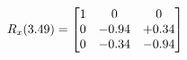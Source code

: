 \documentclass[preview]{standalone}
\begin{document}
\begin{align*}
\special{dvisvgm:raw <g id='unique000'>}R_{x}(3.49) = \begin{bmatrix}1 & 0 & 0 \\0 & -0.94 & +0.34 \\0 & -0.34 & -0.94\end{bmatrix}\special{dvisvgm:raw </g>}
\end{align*}
\end{document}
